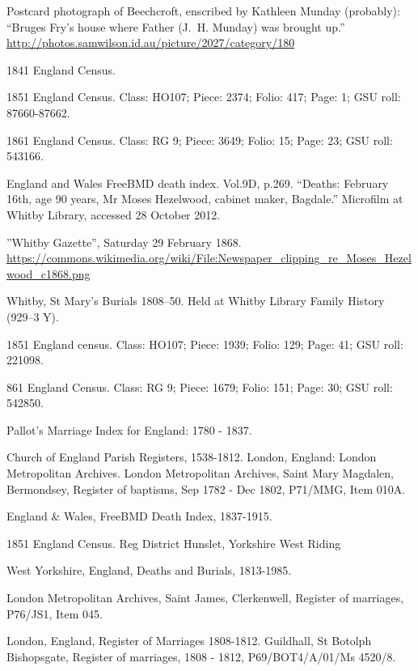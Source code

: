 \begin{thebibliography}{99}
	Postcard photograph of Beechcroft,
	enscribed by Kathleen Munday (probably):
	``Bruges Fry's house where Father (J.~H. Munday) was brought up.''
	\url{http://photos.samwilson.id.au/picture/2027/category/180}

	1841 England Census.

	1851 England Census. Class: HO107; Piece: 2374; Folio: 417; Page: 1; GSU roll: 87660-87662.

	1861 England Census. Class: RG 9; Piece: 3649; Folio: 15; Page: 23; GSU roll: 543166.

	England and Wales FreeBMD death index. Vol.9D, p.269.
	``Deaths: February 16th, age 90 years, Mr Moses Hezelwood, cabinet maker, Bagdale.''
	Microfilm at Whitby Library, accessed 28 October 2012.

	''Whitby Gazette'', Saturday 29 February 1868.
	\url{https://commons.wikimedia.org/wiki/File:Newspaper_clipping_re_Moses_Hezelwood_c1868.png}

	Whitby, St Mary's Burials 1808--50. Held at Whitby Library Family History (929--3 Y).

	 1851 England census. Class: HO107; Piece: 1939; Folio: 129; Page: 41; GSU roll: 221098.

	861 England Census. Class: RG 9; Piece: 1679; Folio: 151; Page: 30; GSU roll: 542850.

	 Pallot's Marriage Index for England: 1780 - 1837.

	Church of England Parish Registers, 1538-1812. London, England: London Metropolitan Archives.
	London Metropolitan Archives, Saint Mary Magdalen, Bermondsey, Register of baptisms, Sep 1782 - Dec 1802, 		P71/MMG, Item 010A.

	England \& Wales, FreeBMD Death Index, 1837-1915.

	1851 England Census. Reg District Hunslet, Yorkshire West Riding

	West Yorkshire, England, Deaths and Burials, 1813-1985.

	London Metropolitan Archives, Saint James, Clerkenwell, Register of marriages, P76/JS1, Item 045.

	 London, England, Register of Marriages 1808-1812.
	 Guildhall, St Botolph Bishopsgate, Register of marriages, 1808 - 1812, P69/BOT4/A/01/Ms 4520/8.


\end{thebibliography}
